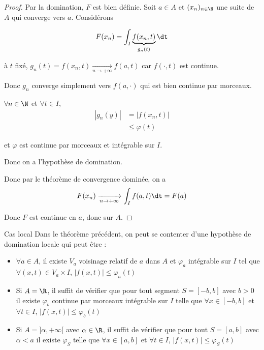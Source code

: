 \begin{proof}
    Par la domination, $F$ est bien définie. Soit $a \in A$ et $(x_n)_{n \in \N}$ une suite de $A$ qui converge 
    vers $a$. Considérons 

    $$F(x_n) = \int_I \underbrace{f(x_n, t)}_{g_n(t)} \dt$$
    
    à $t$ fixé, $g_n(t) = f(x_n, t) \xrightarrow[n \to + \infty]{} f(a, t)$ car 
    $f(\cdot, t)$ est continue.

    Donc $g_n$ converge simplement vers $f(a, \cdot)$ qui est bien continue par morceaux. 

    $\forall n \in \N$ et $\forall t \in I$, 
    \begin{align}
        |g_n(y)| & = |f(x_n, t)| \\
        & \leqslant \varphi(t)
    \end{align}

    et $\varphi$ est continue par morceaux et intégrable sur $I$.

    Donc on a l'hypothèse de domination. 

    Donc par le théorème de convergence dominée, on a 
    $$F(x_n) \xrightarrow[n \to + \infty]{} \int_I f(a, t) \dt = F(a)$$

    Donc $F$ est continue en $a$, donc sur $A$. 
\end{proof}

\begin{theoreme}{Cas local}{}
    Dans le théorème précédent, on peut se contenter d'une hypothèse de domination locale qui 
    peut être : 
    \begin{itemize}
        \item $\forall a \in A$, il existe $V_a$ voisinage relatif de $a$ dans $A$ et $\varphi_a$
        intégrable sur $I$ tel que $\forall (x, t) \in V_a \times I$, $|f(x, t)| \leqslant \varphi_a(t)$
        \item Si $A = \R$, il suffit de vérifier que pour tout segment $S = [-b, b]$ avec $b > 0$ il existe 
        $\varphi_b$ continue par morceaux intégrable sur $I$ telle que 
        $\forall x \in [-b, b]$ et $\forall t \in I$, $|f(x, t)| \leqslant \varphi_b(t)$
        \item Si $A = ]\alpha, + \infty[$ avec $\alpha \in \R$, il suffit de vérifier que pour tout 
        $S = [a, b]$ avec $\alpha <a$ il existe $\varphi_S$ telle que $\forall x \in [a, b]$ et $\forall t \in I$, $|f(x, t)| \leqslant \varphi_S(t)$
    \end{itemize}
\end{theoreme}

